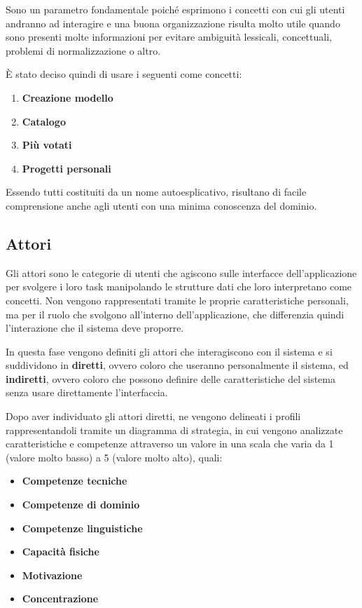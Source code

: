 \documentclass[12pt,italian,]{report}
\providecommand{\tightlist}{%
  \setlength{\itemsep}{0pt}\setlength{\parskip}{0pt}}
\begin{document}
Sono un parametro fondamentale poiché esprimono i concetti con cui gli
utenti andranno ad interagire e una buona organizzazione risulta molto
utile quando sono presenti molte informazioni per evitare ambiguità
lessicali, concettuali, problemi di normalizzazione o altro.

È stato deciso quindi di usare i seguenti come concetti:

\begin{enumerate}
\def\labelenumi{\arabic{enumi}.}
\tightlist
\item
  \textbf{Creazione modello}
\item
  \textbf{Catalogo}
\item
  \textbf{Più votati}
\item
  \textbf{Progetti personali}
\end{enumerate}

Essendo tutti costituiti da un nome autoesplicativo, risultano di facile comprensione anche agli utenti con una minima conoscenza del dominio.

\hypertarget{attori}{%
\subsection{Attori}\label{attori}}

Gli attori sono le categorie di utenti che agiscono sulle interfacce
dell'applicazione per svolgere i loro task manipolando le strutture dati
che loro interpretano come concetti. Non vengono rappresentati tramite
le proprie caratteristiche personali, ma per il ruolo che svolgono
all'interno dell'applicazione, che differenzia quindi l'interazione che
il sistema deve proporre.

In questa fase vengono definiti gli attori che interagiscono con il
sistema e si suddividono in \textbf{diretti}, ovvero coloro che
useranno personalmente il sistema, ed \textbf{indiretti}, ovvero coloro
che possono definire delle caratteristiche del sistema senza usare
direttamente l'interfaccia.

Dopo aver individuato gli attori diretti, ne vengono delineati i profili
rappresentandoli tramite un diagramma di strategia, in cui vengono
analizzate caratteristiche e competenze attraverso un valore in una
scala che varia da 1 (valore molto basso) a 5 (valore molto alto),
quali:

\begin{itemize}
\tightlist
\item
  \textbf{Competenze tecniche}
\item
  \textbf{Competenze di dominio}
\item
  \textbf{Competenze linguistiche}
\item
  \textbf{Capacità fisiche}
\item
  \textbf{Motivazione}
\item
  \textbf{Concentrazione}
\end{itemize}
\end{document}
